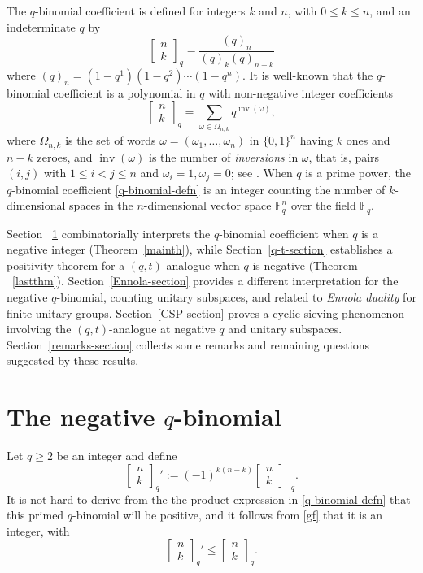\documentclass[10pt]{amsart}
\theoremstyle{plain}
\theoremstyle{definition}
\theoremstyle{remark}
\numberwithin{equation}{section}
\newcommand\qbin[3]{\left[\begin{matrix} #1 \\ #2 \end{matrix} \right]_{#3}}
\newcommand\inv{\operatorname{inv}}
\newcommand\FF{\mathbb{F}}
\begin{document}
 The $q$-binomial coefficient is defined for
integers $k$ and $n$, with $0\le k\le n$, and an indeterminate $q$ by
\begin{equation}
\label{q-binomial-defn}
\qbin{n}{k}{q}=
\frac{(q)_n}{(q)_k(q)_{n-k}}
\end{equation}
where $(q)_n=(1-q^1)(1-q^2)\cdots(1-q^n)$.
It is well-known \cite[p. 39]{A} that the 
$q$-binomial coefficient is a polynomial in
$q$ with non-negative integer coefficients
\begin{equation}
\label{gf}
\qbin{n}{k}{q}=\sum_{\omega\in \Omega_{n,k}} q^{\inv(\omega)},
\end{equation}
where 
$\Omega_{n,k}$ is the set of words 
$\omega=(\omega_1,\ldots,\omega_n)$ in $\{0,1\}^n$
having $k$ ones and $n-k$ zeroes, 
and $\inv(\omega)$ is the number of {\it inversions} in $\omega$, 
that is, pairs $(i,j)$ with $1 \leq i < j \leq n$ and
$\omega_i=1, \omega_j=0$; see \cite[p. 40]{A}.
When $q$ is a prime power, the $q$-binomial coefficient 
\eqref{q-binomial-defn} is an integer
counting the number of  $k$-dimensional spaces in the $n$-dimensional vector space
$\FF_q^n$ over the field $\FF_q$. 

Section ~\ref{definition-section} combinatorially
interprets the $q$-binomial coefficient when $q$ is a 
negative integer (Theorem~\ref{mainth}),
while Section~\ref{q-t-section} establishes a 
positivity theorem for a $(q,t)$-analogue when $q$ is negative 
(Theorem ~\ref{lastthm}).  Section~\ref{Ennola-section}
provides a different interpretation for the negative $q$-binomial,
counting unitary subspaces, and related to {\it Ennola duality} for
finite unitary groups.  Section~\ref{CSP-section} 
proves a cyclic sieving phenomenon
involving the $(q,t)$-analogue at negative $q$ and unitary subspaces. 
Section~\ref{remarks-section} collects some
remarks and remaining questions suggested by these results.







\section{The negative $q$-binomial}
\label{definition-section}


Let $q\ge2$ be an integer and define
\begin{equation}
\label{negative-q-binomial-definition}
\qbin{n}{k}{q}':=(-1)^{k(n-k)}\qbin{n}{k}{-q}.
\end{equation}
\noindent
It is not hard to derive from the
the product expression in \eqref{q-binomial-defn} that this 
primed $q$-binomial will be positive, and it follows
from \eqref{gf} that it is an integer, with
\begin{equation}
\label{ineq}
\qbin{n}{k}{q}'\le \qbin{n}{k}{q}.
\end{equation}
\end{document}
